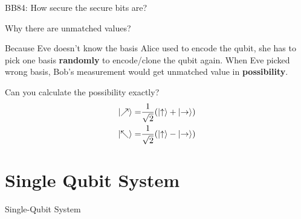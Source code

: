 \documentclass{beamer}
\begin{document}
\begin{frame}[fragile]{BB84: How secure the secure bits are?}

  \begin{block}{Why there are unmatched values?}
    {\scriptsize
      Because Eve doesn't know the basis Alice used to encode the qubit, she has to pick one basis \textbf{randomly} to encode/clone the qubit again.
      When Eve picked wrong basis, Bob's measurement would get unmatched value in \textbf{possibility}.
      \par
      Can you calculate the possibility exactly?
      \begin{align*}
        \ket{\nearrow} =& \frac{1}{\sqrt{2}}(\ket{\uparrow} + \ket{\rightarrow}) \\
        \ket{\nwarrow} =& \frac{1}{\sqrt{2}}(\ket{\uparrow} - \ket{\rightarrow})
      \end{align*}
    }%
  \end{block}
\end{frame}

\section{Single Qubit System}
\begin{frame}
  Single-Qubit System
\end{frame}
\end{document}
